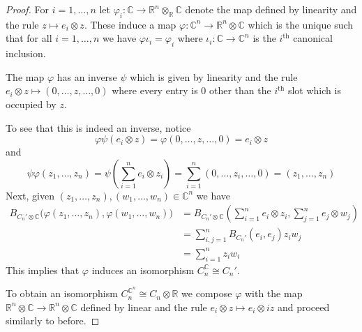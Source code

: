 \documentclass[12pt]{article}
\theoremstyle{plain}
\theoremstyle{definition}
\newcommand{\bb}[1]{\mathbb{#1}}
\newcommand{\lto}{\longrightarrow}
\begin{document}
\begin{proof}
	For $i = 1, \ldots, n$ let $\varphi_i: \bb{C} \lto \bb{R}^n \otimes_\bb{R} \bb{C}$ denote the map defined by linearity and the rule $z \longmapsto e_i \otimes z$. These induce a map $\varphi: \bb{C}^n \lto \bb{R}^n \otimes \bb{C}$ which is the unique such that for all $i = 1, \ldots, n$ we have $\varphi \iota_i = \varphi_i$ where $\iota_i: \bb{C} \lto \bb{C}^n$ is the $i^{\text{th}}$ canonical inclusion.
	
	The map $\varphi$ has an inverse $\psi$ which is given by linearity and the rule $e_i \otimes z \longmapsto (0, \ldots, z, \ldots, 0)$ where every entry is $0$ other than the $i^{\text{th}}$ slot which is occupied by $z$.
	
	To see that this is indeed an inverse, notice
	\begin{equation}
		\varphi \psi (e_i \otimes z) = \varphi (0, \ldots, z, \ldots, 0) = e_i \otimes z
		\end{equation}
	and
	\begin{equation}
		\psi \varphi (z_1, \ldots, z_n) = \psi (\sum_{i = 1}^n e_i \otimes z_i) = \sum_{i = 1}^n (0, \ldots, z_i, \ldots, 0) = (z_1, \ldots, z_n)
		\end{equation}
	Next, given $(z_1, \ldots, z_n), (w_1, \ldots, w_n) \in \bb{C}^n$ we have
	\begin{align*}
		B_{C_n' \otimes \bb{C}}\big(\varphi(z_1, \ldots, z_n), \varphi(w_1, \ldots, w_n)\big) &= B_{C_n' \otimes \bb{C}}(\sum_{i = 1}^n e_i \otimes z_i, \sum_{j = 1}^n e_j \otimes w_j)\\
		&= \sum_{i,j = 1}^n B_{C_n'}(e_i, e_j)z_iw_j\\
		&= \sum_{i = 1}^n z_iw_i
		\end{align*}
	This implies that $\varphi$ induces an isomorphism $C_n^{\bb{C}} \cong C_n'$.
	
	To obtain an isomorphism $C_n^{\bb{C}^n} \cong C_n \otimes \bb{R}$ we compose $\varphi$ with the map $\bb{R}^n \otimes \bb{C} \lto \bb{R}^n \otimes \bb{C}$ defined by linear and the rule $e_i \otimes z \longmapsto e_i \otimes i z$ and proceed similarly to before.
\end{proof}
\end{document}
